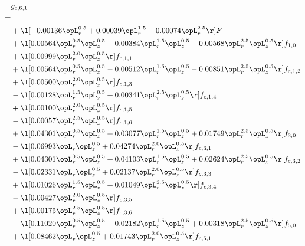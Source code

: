 \begin{alignat}{2} 
\label{eq:g_61_0} 
& g_{c,6,1} \nonumber \\ 
 = \\ 
& + \l[  -0.00136 \opL_r^{0.5} +  0.00039 \opL_r^{1.5}   -0.00074 \opL_r^{2.5}  \r] F \nonumber \\ 
& + \l[  0.00564 \opL_r^{0.5} \opL_z^{0.5}   -0.00384 \opL_r^{1.5} \opL_z^{0.5}   -0.00568 \opL_r^{2.5} \opL_z^{0.5}  \r] f_{1,0} \nonumber \\ 
& + \l[  0.00999 \opL_r^{2.0} \opL_z^{0.5}  \r] f_{c,1,1} \nonumber \\ 
& + \l[  0.00564 \opL_r^{0.5} \opL_z^{0.5}   -0.00512 \opL_r^{1.5} \opL_z^{0.5}   -0.00851 \opL_r^{2.5} \opL_z^{0.5}  \r] f_{c,1,2} \nonumber \\ 
& + \l[  0.00500 \opL_r^{2.0} \opL_z^{0.5}  \r] f_{c,1,3} \nonumber \\ 
& - \l[  0.00128 \opL_r^{1.5} \opL_z^{0.5} +  0.00341 \opL_r^{2.5} \opL_z^{0.5}  \r] f_{c,1,4} \nonumber \\ 
& + \l[  0.00100 \opL_r^{2.0} \opL_z^{0.5}  \r] f_{c,1,5} \nonumber \\ 
& - \l[  0.00057 \opL_r^{2.5} \opL_z^{0.5}  \r] f_{c,1,6} \nonumber \\ 
& + \l[  0.04301 \opL_r^{0.5} \opL_z^{0.5} +  0.03077 \opL_r^{1.5} \opL_z^{0.5} +  0.01749 \opL_r^{2.5} \opL_z^{0.5}  \r] f_{3,0} \nonumber \\ 
& - \l[  0.06993 \opL_r \opL_z^{0.5} +  0.04274 \opL_r^{2.0} \opL_z^{0.5}  \r] f_{c,3,1} \nonumber \\ 
& + \l[  0.04301 \opL_r^{0.5} \opL_z^{0.5} +  0.04103 \opL_r^{1.5} \opL_z^{0.5} +  0.02624 \opL_r^{2.5} \opL_z^{0.5}  \r] f_{c,3,2} \nonumber \\ 
& - \l[  0.02331 \opL_r \opL_z^{0.5} +  0.02137 \opL_r^{2.0} \opL_z^{0.5}  \r] f_{c,3,3} \nonumber \\ 
& + \l[  0.01026 \opL_r^{1.5} \opL_z^{0.5} +  0.01049 \opL_r^{2.5} \opL_z^{0.5}  \r] f_{c,3,4} \nonumber \\ 
& - \l[  0.00427 \opL_r^{2.0} \opL_z^{0.5}  \r] f_{c,3,5} \nonumber \\ 
& + \l[  0.00175 \opL_r^{2.5} \opL_z^{0.5}  \r] f_{c,3,6} \nonumber \\ 
& - \l[  0.11020 \opL_r^{0.5} \opL_z^{0.5} +  0.02182 \opL_r^{1.5} \opL_z^{0.5} +  0.00318 \opL_r^{2.5} \opL_z^{0.5}  \r] f_{5,0} \nonumber \\ 
& + \l[  0.08462 \opL_r \opL_z^{0.5} +  0.01743 \opL_r^{2.0} \opL_z^{0.5}  \r] f_{c,5,1} \nonumber \\ 

\end{alignat}
